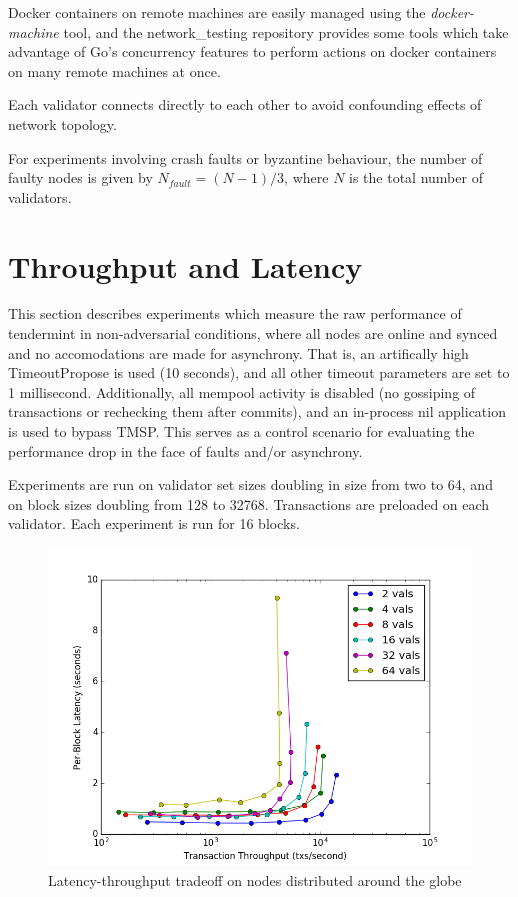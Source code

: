 Docker containers on remote machines are easily managed using the \emph{docker-machine} tool, 
and the network\_testing repository provides some tools which take advantage of Go's concurrency features
to perform actions on docker containers on many remote machines at once.

Each validator connects directly to each other to avoid confounding effects of network topology.

For experiments involving crash faults or byzantine behaviour, the number of faulty nodes is given by $N_{fault} = (N-1)/3$,
where $N$ is the total number of validators.

\section{Throughput and Latency}

This section describes experiments which measure the raw performance of tendermint in non-adversarial conditions,
where all nodes are online and synced and no accomodations are made for asynchrony.
That is, an artifically high TimeoutPropose is used (10 seconds), and all other timeout parameters are set to 1 millisecond.
Additionally, all mempool activity is disabled (no gossiping of transactions or rechecking them after commits),
and an in-process nil application is used to bypass TMSP.
This serves as a control scenario for evaluating the performance drop in the face of faults and/or asynchrony.

Experiments are run on validator set sizes doubling in size from two to 64, and on block sizes doubling from 128 to 32768.
Transactions are preloaded on each validator. Each experiment is run for 16 blocks. 


\begin{figure}[]
	\includegraphics[width=\linewidth,height=\textheight,keepaspectratio]{figures/throughput/latency-throughput.png}
    	\centering
	\caption[Latency-throughput in non-faulty network]{Latency-throughput tradeoff on nodes distributed around the globe}
	\label{fig:exp_throughput_latency}
\end{figure}

